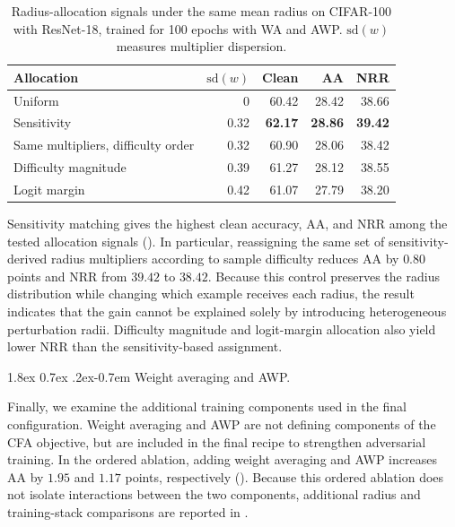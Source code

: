 \documentclass{article} %
\makeatletter
\theoremstyle{plain}
\renewcommand{\paragraph}{\@startsection{paragraph}{4}{\z@}%
  {1.8ex \@plus 0.7ex \@minus .2ex}{-0.7em}%
  {\normalfont\normalsize\bfseries}}
\makeatother
\begin{document}
\begin{table}[!htbp]
  \centering
  \small
  \setlength{\tabcolsep}{4.5pt}
  \caption{
  Radius-allocation signals under the same mean radius on CIFAR-100 with
  ResNet-18, trained for 100 epochs with WA and AWP.
  \(\mathrm{sd}(w)\) measures multiplier dispersion.
  }
  \label{tab:allocation}
  \begin{tabular}{lrrrr}
    \toprule
    Allocation & \(\mathrm{sd}(w)\) & Clean & AA & NRR \\
    \midrule
    Uniform
      & 0 & 60.42 & 28.42 & 38.66 \\
    Sensitivity
      & 0.32 & \textbf{62.17} & \textbf{28.86} & \textbf{39.42} \\
    Same multipliers, difficulty order
      & 0.32 & 60.90 & 28.06 & 38.42 \\
    Difficulty magnitude
      & 0.39 & 61.27 & 28.12 & 38.55 \\
    Logit margin
      & 0.42 & 61.07 & 27.79 & 38.20 \\
    \bottomrule
  \end{tabular}
\end{table}

Sensitivity matching gives the highest clean accuracy, AA, and NRR among the
tested allocation signals ().
In particular, reassigning the same set of sensitivity-derived radius
multipliers according to sample difficulty reduces AA by \(0.80\) points and
NRR from \(39.42\) to \(38.42\).
Because this control preserves the radius distribution while changing which
example receives each radius, the result indicates that the gain cannot be
explained solely by introducing heterogeneous perturbation radii.
Difficulty magnitude and logit-margin allocation also yield lower NRR than
the sensitivity-based assignment.


\paragraph{Weight averaging and AWP.}

Finally, we examine the additional training components used in the final
configuration.
Weight averaging and AWP are not defining components of the CFA objective,
but are included in the final recipe to strengthen adversarial training.
In the ordered ablation, adding weight averaging and AWP increases AA by
\(1.95\) and \(1.17\) points, respectively
().
Because this ordered ablation does not isolate interactions between the two
components, additional radius and training-stack comparisons are reported in
.
\end{document}
